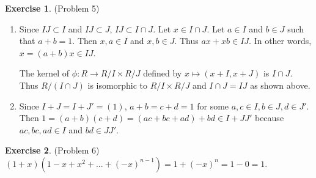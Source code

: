 \documentclass[12pt, psamsfonts]{amsart}
\theoremstyle{definition}
\newtheorem*{exer}{Exercise}
\theoremstyle{remark}
\numberwithin{equation}{section}
\begin{document}
\begin{exer}{(Problem 5)}
  \begin{enumerate}
    \item 
      Since $IJ \subset I$ and $IJ \subset J$, $IJ \subset I \cap J$.
      Let $x \in I \cap J$.
      Let $a \in I$ and $b \in J$ such that $a + b = 1$.
      Then $x, a \in I$ and $x, b \in J$.
      Thus $ax + xb \in IJ$.
      In other words, $x = (a + b)x \in IJ$.

      The kernel of $\phi: R \rightarrow R / I \times R / J$ defined by $x \mapsto (x + I, x + J)$ is $I \cap J$.
      Thus $R / (I \cap J)$ is isomorphic to $R / I \times R / J$ and $I \cap J = IJ$ as shown above.
    \item
      Since $I + J = I + J' = (1)$, $a + b = c + d = 1$ for some $a, c \in I, b \in J, d \in J'$.
      Then $1 = (a + b)(c + d) = (ac + bc + ad) + bd \in I + JJ'$ because $ac, bc, ad \in I$ and $bd \in JJ'$.
  \end{enumerate}
\end{exer}

\begin{exer}{(Problem 6)}
  $(1 + x)(1 - x + x^2 + ... + (-x)^{n - 1}) = 1 + (-x)^n = 1 - 0 = 1$.
\end{exer}
\end{document}
